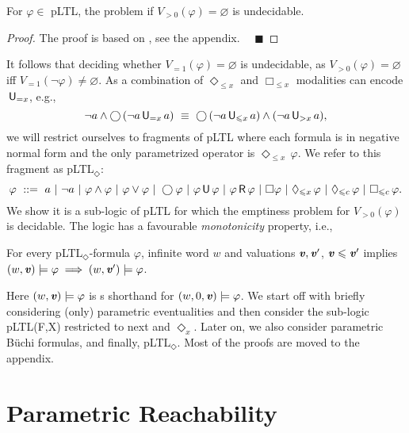 \documentclass{llncs}
\newcommand{\where}{\ | \ }
\newcommand{\Next}{\bigcirc \, }
\newcommand{\Until}{\mbox{$\, {\sf U}\,$}}
\newcommand{\U}{\Until}
\newcommand{\Release}{\mbox{$\, {\sf R}\,$}}
\newcommand{\X}{\Next}
\renewcommand{\leq}{\leqslant}
\renewcommand{\emptyset}{\varnothing}
\renewcommand{\a}[1]{\textbf{\textit{#1}}}
\newcommand{\de}{\Diamond}
\begin{document}
\begin{proposition}\label{undy}
For $\varphi \in$ pLTL, the problem if $V_{> 0}(\varphi) = \emptyset$ is undecidable.
\end{proposition}
\begin{proof}
The proof is based on  \cite[Th.\ 4.1]{DBLP:journals/tocl/AlurETP01}, see the appendix.
\hfill $\quad\blacksquare$
\end{proof}
It follows that deciding whether $V_{=1}(\varphi)=\emptyset$ is undecidable, as $V_{>0}(\varphi)= \emptyset$ iff $V_{=1}(\neg\varphi)\neq \emptyset$.
\noindent
As a combination of $\de_{\leq x}$ and $\Box_{\leq x}$ modalities can encode $\U\!_{=x}$, e.g., 
$$
\neg a \wedge \X (\neg a \U\!_{=x} \, a) 
\ \equiv \ 
\X (\neg a \U\!_{\leq x} \, a) \wedge (\neg a \U\!_{> x} \, a),
$$
we will restrict ourselves to fragments of pLTL where each formula is in negative normal form and 
the only parametrized operator is $\de_{\leq x} \, \varphi$. 
We refer to this fragment as pLTL$_\de$:
\begin{equation}\label{pltl_d}
\varphi \ ::= \ a \where \neg a \where \varphi \wedge  \varphi \where \varphi  \vee  \varphi \where \X\! \varphi \where \varphi \U \varphi 
\where \varphi \Release \varphi 
\where \Box \varphi \where \de_{\leq x}  \, \varphi \where \de_{\leq c} \, \varphi \where \Box_{\leq c} \, \varphi. 
\end{equation}
We show it is a sub-logic of pLTL for which the emptiness problem for $V_{> 0}(\varphi)$ is decidable.  The logic has a favourable \emph{monotonicity} property, i.e.,
\begin{remark}\label{monotonicity}
For every pLTL$_\de$-formula $\varphi$, infinite word $w$ and valuations ${\a v}, {\a v}'$, ${\a v} \leq {\a v}'$ 
implies $(w,{\a v}) \models \varphi \implies (w,{\a v}')\models \varphi$.
\end{remark}
Here $(w,{\a v}) \models \varphi$ is s shorthand for $(w,0,{\a v}) \models \varphi$.
We start off with briefly considering (only) parametric eventualities and then consider the sub-logic pLTL(F,X) restricted to next and $\de_{x}$.
Later on, we also consider parametric B\"uchi formulas, and finally, pLTL$_\de$. Most of the proofs are moved to the appendix.

\section{Parametric Reachability}
\label{sec:reach}
\end{document}
